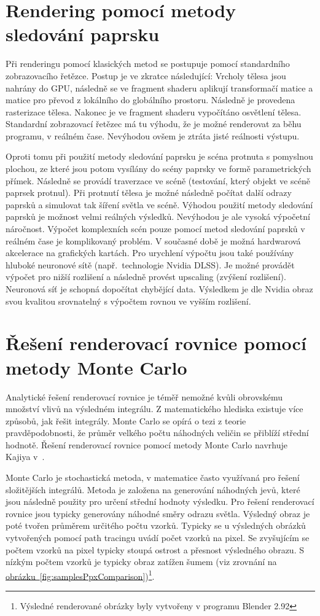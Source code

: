 \documentclass[czech,master]{diploma}
\begin{document}
\section{Rendering pomocí metody sledování paprsku}
Při renderingu pomocí klasických metod se postupuje pomocí standardního zobrazovacího řetězce. Postup je ve zkratce následující: Vrcholy tělesa jsou nahrány do GPU, následně se ve fragment shaderu aplikují transformačí matice a matice pro převod z lokálního do globálního prostoru. Následně je provedena rasterizace tělesa. Nakonec je ve fragment shaderu vypočítáno osvětlení tělesa. Standardní zobrazovací řetězec má tu výhodu, že je možné renderovat za běhu programu, v reálném čase. Nevýhodou ovšem je ztráta jisté reálnosti výstupu.\par
Oproti tomu při použití metody sledování paprsku je scéna protnuta s pomyslnou plochou, ze které jsou potom vysílány do scény paprsky ve formě parametrických přímek. Následně se provádí traverzace ve scéně (testování, který objekt ve scéně paprsek protnul). Při protnutí tělesa je možné následně počítat další odrazy paprsků a simulovat tak šíření světla ve scéně. Výhodou použití metody sledování paprsků je možnost velmi reálných výsledků. Nevýhodou je ale vysoká výpočetní náročnost. Výpočet komplexních scén pouze pomocí metod sledování paprsků v reálném čase je komplikovaný problém. V současné době je možná hardwarová akcelerace na grafických kartách. Pro urychlení výpočtu jsou také používány hluboké neuronové sítě (např.\ technologie Nvidia DLSS). Je možné provádět výpočet pro nižší rozlišení a následně provést upscaling (zvýšení rozlišení). Neuronová síť je schopná dopočítat chybějící data. Výsledkem je dle Nvidia obraz svou kvalitou srovnatelný s výpočtem rovnou ve vyšším rozlišení.

\section{Řešení renderovací rovnice pomocí metody Monte Carlo}
Analytické řešení renderovací rovnice je téměř nemožné kvůli obrovskému množství vlivů na výsledném integrálu. Z matematického hlediska existuje více způsobů, jak řešit integrály. Monte Carlo se opírá o tezi z teorie pravděpodobnosti, že průměr velkého počtu náhodných veličin se přiblíží střední hodnotě. Řešení renderovací rovnice pomocí metody Monte Carlo navrhuje Kajiya v~\cite{KajiyaRenderEq}. \par
Monte Carlo je stochastická metoda, v matematice často využívaná pro řešení složitějších integrálů. Metoda je založena na generování náhodných jevů, které jsou následně použity pro určení střední hodnoty výsledku. Pro řešení renderovací rovnice jsou typicky generovány náhodné směry odrazu světla. Výsledný obraz je poté tvořen průměrem určitého počtu vzorků. Typicky se u výsledných obrázků vytvořených pomocí path tracingu uvádí počet vzorků na pixel. Se zvyšujícím se počtem vzorků na pixel typicky stoupá ostrost a přesnost výsledného obrazu. S nízkým počtem vzorků je typicky obraz zatížen šumem (viz zrovnání na \hyperref[fig:samplesPpxComparison]{obrázku~\ref{fig:samplesPpxComparison}})\footnote{Výsledné renderované obrázky byly vytvořeny v programu Blender 2.92}.
\end{document}
